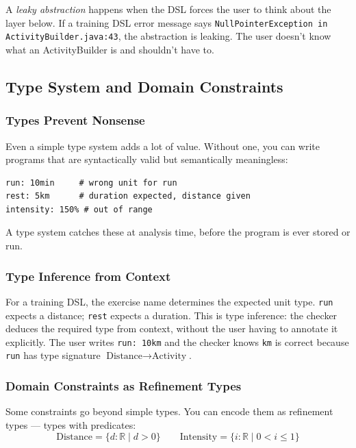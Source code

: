 A \emph{leaky abstraction} happens when the DSL forces the user to think about the layer
below. If a training DSL error message says \texttt{NullPointerException in
ActivityBuilder.java:43}, the abstraction is leaking. The user doesn't know what an
ActivityBuilder is and shouldn't have to.

\subsection{Type System and Domain Constraints}

\subsubsection{Types Prevent Nonsense}

Even a simple type system adds a lot of value. Without one, you can write programs that
are syntactically valid but semantically meaningless:

\begin{lstlisting}
run: 10min     # wrong unit for run
rest: 5km      # duration expected, distance given
intensity: 150% # out of range
\end{lstlisting}

A type system catches these at analysis time, before the program is ever stored or run.

\subsubsection{Type Inference from Context}

For a training DSL, the exercise name determines the expected unit type. \texttt{run}
expects a distance; \texttt{rest} expects a duration. This is type inference: the checker
deduces the required type from context, without the user having to annotate it explicitly.
The user writes \texttt{run: 10km} and the checker knows \texttt{km} is correct because
\texttt{run} has type signature $\text{Distance} \to \text{Activity}$.

\subsubsection{Domain Constraints as Refinement Types}

Some constraints go beyond simple types. You can encode them as refinement types --- types
with predicates:
\[
  \text{Distance} = \{ d : \mathbb{R} \mid d > 0 \}
  \qquad
  \text{Intensity} = \{ i : \mathbb{R} \mid 0 < i \leq 1 \}
\]


